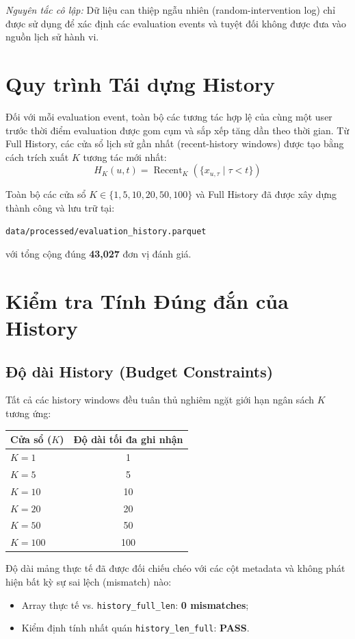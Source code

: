\documentclass[12pt,a4paper]{article}
\begin{document}
\textit{Nguyên tắc cô lập:} Dữ liệu can thiệp ngẫu nhiên (random-intervention log) chỉ được sử dụng để xác định các evaluation events và tuyệt đối không được đưa vào nguồn lịch sử hành vi.

\section{Quy trình Tái dựng History}
Đối với mỗi evaluation event, toàn bộ các tương tác hợp lệ của cùng một user trước thời điểm evaluation được gom cụm và sắp xếp tăng dần theo thời gian. Từ Full History, các cửa sổ lịch sử gần nhất (recent-history windows) được tạo bằng cách trích xuất $K$ tương tác mới nhất:
$$H_K(u,t) = \operatorname{Recent}_K \left( \{x_{u,\tau} \mid \tau < t\} \right)$$

Toàn bộ các cửa sổ $K \in \{1, 5, 10, 20, 50, 100\}$ và Full History đã được xây dựng thành công và lưu trữ tại:
\begin{center}
\texttt{data/processed/evaluation\_history.parquet}
\end{center}
với tổng cộng đúng \textbf{43,027} đơn vị đánh giá.

\section{Kiểm tra Tính Đúng đắn của History}

\subsection{Độ dài History (Budget Constraints)}
Tất cả các history windows đều tuân thủ nghiêm ngặt giới hạn ngân sách $K$ tương ứng:
\begin{center}
\begin{tabular}{lc}
\toprule
\textbf{Cửa sổ ($K$)} & \textbf{Độ dài tối đa ghi nhận} \\
\midrule
$K=1$   & 1 \\
$K=5$   & 5 \\
$K=10$  & 10 \\
$K=20$  & 20 \\
$K=50$  & 50 \\
$K=100$ & 100 \\
\bottomrule
\end{tabular}
\end{center}

Độ dài mảng thực tế đã được đối chiếu chéo với các cột metadata và không phát hiện bất kỳ sự sai lệch (mismatch) nào:
\begin{itemize}[noitemsep]
    \item Array thực tế vs. \texttt{history\_full\_len}: \textbf{0 mismatches};
    \item Kiểm định tính nhất quán \texttt{history\_len\_full}: \textbf{PASS}.
\end{itemize}
\end{document}
